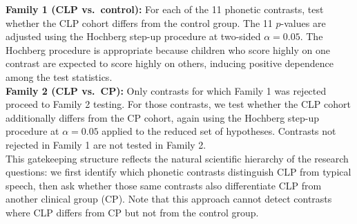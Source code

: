 \documentclass{article}
\begin{document}
\noindent \textbf{Family 1 (CLP vs.\ control):} For each of the 11 phonetic contrasts, 
test whether the CLP cohort differs from the control group. The 11 
$p$-values are adjusted using the Hochberg step-up procedure at two-sided 
$\alpha = 0.05$. The Hochberg procedure is appropriate because children who 
score highly on one contrast are expected to score highly on others, inducing 
positive dependence among the test statistics. \\ 

\noindent \textbf{Family 2 (CLP vs.\ CP):} Only contrasts for which Family 1 was 
rejected proceed to Family 2 testing. For those contrasts, we test whether 
the CLP cohort additionally differs from the CP cohort, again using the 
Hochberg step-up procedure at $\alpha = 0.05$ applied to the reduced set of 
hypotheses. Contrasts not rejected in Family 1 are not tested in Family 2. \\ 

\noindent This gatekeeping structure reflects the natural scientific hierarchy of the research questions: we first identify which phonetic contrasts distinguish CLP from typical speech, then ask whether those same contrasts also differentiate CLP from another clinical group (CP). Note that this approach cannot detect contrasts where CLP differs from CP but not from the control group.
\end{document}
